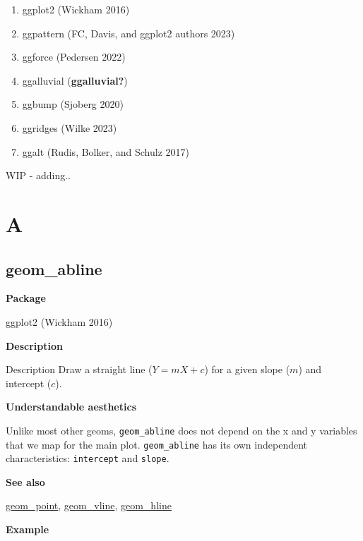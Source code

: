 \documentclass[
  letterpaper,
  DIV=11,
  numbers=noendperiod]{scrreprt}
\begin{document}

\begin{enumerate}
\def\labelenumi{\arabic{enumi}.}
\item
  ggplot2 (Wickham 2016)
\item
  ggpattern (FC, Davis, and ggplot2 authors 2023)
\item
  ggforce (Pedersen 2022)
\item
  ggalluvial (\textbf{ggalluvial?})
\item
  ggbump (Sjoberg 2020)
\item
  ggridges (Wilke 2023)
\item
  ggalt (Rudis, Bolker, and Schulz 2017)
\end{enumerate}

WIP - adding..


\chapter{A}\label{sec-a}

\section{geom\_abline}\label{abline}

\textbf{Package}

ggplot2 (Wickham 2016)

\textbf{Description}

Description Draw a straight line (\(Y=mX+c\)) for a given slope (\(m\))
and intercept (\(c\)).

\textbf{Understandable aesthetics}

Unlike most other geoms, \texttt{geom\_abline} does not depend on the x
and y variables that we map for the main plot. \texttt{geom\_abline} has
its own independent characteristics: \texttt{intercept} and
\texttt{slope}.

\textbf{See also}

\hyperref[point]{geom\_point}, \hyperref[vline]{geom\_vline},
\hyperref[hline]{geom\_hline}

\textbf{Example}
\end{document}
